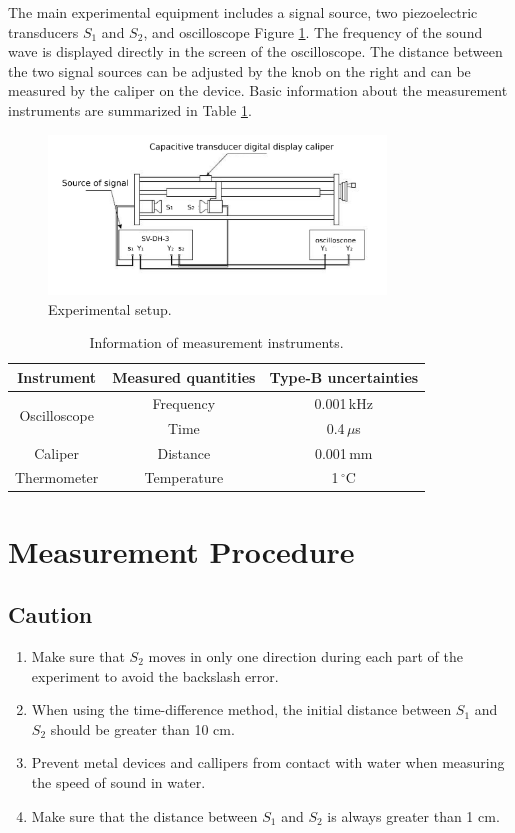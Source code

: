 \documentclass[a4paper]{article}
\begin{document}
The main experimental equipment includes a signal source, two piezoelectric transducers $S_1$ and $S_2$, and oscilloscope Figure \ref{Fig:Exset}. The frequency of the sound wave is displayed directly in the screen of the oscilloscope. The distance between the two signal sources can be adjusted by the knob on the right and can be measured by the caliper on the device. Basic information about the measurement instruments are summarized in Table \ref{Tab:Infof}.

\begin{figure}[htbp]
\centering
\includegraphics[width=0.8\textwidth]{Exset.png}
\caption{Experimental setup.}\label{Fig:Exset}
\end{figure}

\begin{table}[htbp]
\centering
\begin{tabular}{ccc}
  \hline
  Instrument & Measured quantities & Type-B uncertainties \\ \hline
  \multirow{2}{*}{Oscilloscope} & Frequency & 0.001\,kHz \\ & Time & 0.4\,$\mu$s \\ \hline
  Caliper & Distance & 0.001\,mm \\ \hline
  Thermometer & Temperature & 1\,$^{\circ}$C \\ \hline
\end{tabular}
\caption{Information of measurement instruments.}\label{Tab:Infof}
\end{table}


\section{Measurement Procedure}

\subsection*{Caution}
\begin{enumerate}
\item Make sure that $S_2$ moves in only one direction during each part of the experiment to avoid the backslash error.
\item When using the time-difference method, the initial distance between $S_1$ and $S_2$ should be greater than 10 cm. 
\item Prevent metal devices and callipers from contact with water when measuring the speed of sound in water.
\item Make sure that the distance between $S_1$ and $S_2$ is always greater than 1 cm.
\end{enumerate}
\end{document}
